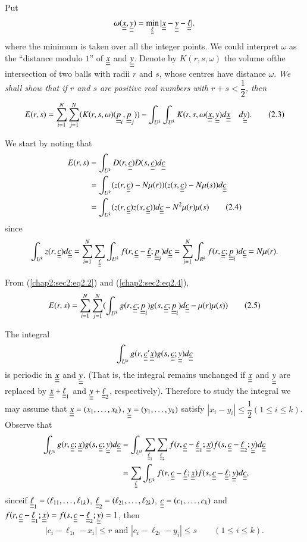 Put
$$
\omega (\uub{x}, \uub{y}) = \min_{\uub{\ell}} |\uub{x} - \uub{y} - \uub{\ell}|.
$$
where the minimum is taken over all the integer points. We could interpret $\omega$ as the ``distance modulo $1$'' of $\uub{x}$ and $\uub{y}$. Denote by $K(r, s, \omega)$ the volume of\pageoriginale the intersection of two balls with radii $r$ and $s$, whose centres have distance $\omega$. {\em We shall show that if $r$ and $s$ are positive real numbers with $r + s < \dfrac{1}{2}$, then}
\begin{equation*}
E(r, s) = \sum_{i=1}^{N} \sum_{j=1}^{N} (K(r, s, \omega) (\uub{p}_{i}, \uub{p}_{j})) - \int_{U^{k}} \int_{U^{k}} K(r, s, \omega (\uub{x}, \uub{y}) d\uub{x} \quad d\uub{y}).\tag{2.3}\label{chap2:sec2:eq2.3}
\end{equation*}

We start by noting that
\begin{align*}
E(r, s) & = \int_{U^{k}} D(r, \uub{c}) D(s, \uub{c}) d\uub{c}\\
 & = \int_{U^{k}} (z(r, \uub{c}) -N\mu(r)) (z(s, \uub{c}) - N\mu (s)) d\uub{c}\\
 & = \int_{U^{k}} (z(r, \uub{c}) z(s, \uub{c})) d\uub{c} - N^{2} \mu (r) \mu (s)\tag{2.4}\label{chap2:sec2:eq2.4}
\end{align*}
since
{\fontsize{10}{12}\selectfont
$$
\int_{U^{k}} z(r, \uub{c}) d\uub{c} = \sum_{i=1}^{N} \sum_{\uub{\ell}}
\int_{U^{k}} f(r, \uub{c} - \uub{\ell} ; \uub{p}_{i}) d\uub{c} =
\sum_{i=1}^{N} \int_{R^{k}} f(r, \uub{c} ; \uub{p}_{i})d\uub{c} =
N\mu(r). 
$$}\relax

From (\ref{chap2:sec2:eq2.2}) and (\ref{chap2:sec2:eq2.4}),
\begin{equation*}
E(r, s) = \sum_{i=1}^{N} \sum_{j=1}^{N} (\int_{U^{k}} g(r, \uub{c} ; \uub{p}_{i}) g(s, \uub{c} ; \uub{p}_{i}) d\uub{c} - \mu(r) \mu(s))\tag{2.5}\label{chap2:sec2:eq2.5}
\end{equation*}

The integral
$$
\int_{U^{k}} g(r, \uub{c} ' \uub{x}) g(s, \uub{c} ; \uub{y}) d\uub{c}
$$
is periodic in $\uub{x}$ and $\uub{y}$. (That is, the integral remains unchanged if $\uub{x}$ and $\uub{y}$ are replaced by $\uub{x} + \uub{\ell}_{1}$ and $\uub{y} + \uub{\ell}_{2}$, respectively). Therefore to study the integral we may assume that $\uub{x} = (x_{1}, \ldots, x_{k})$, $\uub{y} = (y_{1}, \ldots, y_{k})$ satisfy $|x_{i} - y_{i}| \leq \dfrac{1}{2} (1 \leq i \leq k)$. Observe that
\begin{align*}
\int_{U^{k}} g(r, \uub{c} ; \uub{x}) g(s, \uub{c} ; \uub{y}) d\uub{c} & = \int_{U^{k}} \sum_{\uub{\ell}_{1}} \sum_{\uub{\ell}_{2}} f(r, \uub{c} -\uub{\ell}_{1} ; \uub{x}) f(s, \uub{c} - \uub{\ell}_{2} ; \uub{y}) d\uub{c}\\
& = \sum_{\uub{\ell}} \int_{U^{k}} f(r, \uub{c} - \uub{\ell} ; \uub{x}) f(s, \uub{c} - \uub{\ell} ; \uub{y}) d\uub{c},
\end{align*}
since\pageoriginale if $\uub{\ell}_{1} = (\ell_{11}, \ldots, \ell_{1k})$, $\uub{\ell}_{2} = (\ell_{21}, \ldots, \ell_{2k})$, $\uub{c} = (c_{1}, \ldots, c_{k})$ and $f(r, \uub{c} - \uub{\ell}_{1} ;  \uub{x}) = f(s, \uub{c} - \uub{\ell}_{2} ; \uub{y}) = 1$, then
$$
|c_{i} - \ell_{1i} - x_{i}| \leq r \text{ and } |c_{i} - \ell_{2i} - y_{i}| \leq s \qquad (1 \leq i \leq k).
$$

